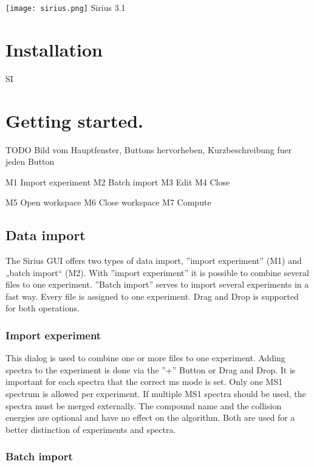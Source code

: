 \documentclass[a4paper,11pt]{article}
\begin{document}
\begin{center}
	\texttt{[image: sirius.png]}
	Sirius 3.1
\end{center}
 
 \tableofcontents
 
 \newpage
  
 \section{Installation}
 
SI
 
 \section{Getting started.}
 
 TODO Bild vom Hauptfenster, Buttons hervorheben, Kurzbeschreibung fuer jeden Button
 
 M1 Import experiment
 M2 Batch import
 M3 Edit
 M4 Close
 
 M5 Open workspace
 M6 Close workspace
 M7 Compute 
 
 \subsection{Data import}
 
 The Sirius GUI offers two types of data import, ''import experiment'' (M1) and „batch import“ (M2). 
 With ''import experiment'' it is possible to combine  several files to one experiment. 
 ''Batch import'' serves to import several experiments in a fast way. Every file is assigned to one experiment. 
 Drag and Drop is supported for both operations.
 
 \subsubsection{Import experiment}
 
 This dialog is used to combine one or more files to one experiment. Adding spectra to the experiment is done via 
 the ''+'' Button or Drag and Drop. It is important for each spectra that the correct ms mode is set.  
 Only one MS1 spectrum is allowed per experiment. If multiple MS1 spectra should be used, the spectra must be merged externally.  
 The compound name and the collision energies are optional and have no effect on the algorithm. 
 Both are used  for a better distinction of experiments and spectra. 
 
 \subsubsection{Batch import}
 
\end{document}
